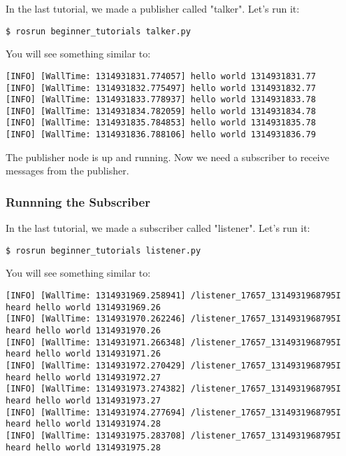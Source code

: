 In the last tutorial, we made a publisher called "talker". Let's run it:

\begin{lstlisting}[breaklines=true languages=bash]
$ rosrun beginner_tutorials talker.py
\end{lstlisting}

You will see something similar to:

\begin{lstlisting}[breaklines=true languages=bash]
[INFO] [WallTime: 1314931831.774057] hello world 1314931831.77
[INFO] [WallTime: 1314931832.775497] hello world 1314931832.77
[INFO] [WallTime: 1314931833.778937] hello world 1314931833.78
[INFO] [WallTime: 1314931834.782059] hello world 1314931834.78
[INFO] [WallTime: 1314931835.784853] hello world 1314931835.78
[INFO] [WallTime: 1314931836.788106] hello world 1314931836.79
\end{lstlisting}

The publisher node is up and running. Now we need a subscriber to receive messages from the publisher.

\subsubsection{Runnning the Subscriber}

In the last tutorial, we made a subscriber called "listener". Let's run it:

\begin{lstlisting}[breaklines=true language=bash]
$ rosrun beginner_tutorials listener.py
\end{lstlisting}

You will see something similar to:

\begin{lstlisting}[breaklines=true language=bash]
[INFO] [WallTime: 1314931969.258941] /listener_17657_1314931968795I heard hello world 1314931969.26
[INFO] [WallTime: 1314931970.262246] /listener_17657_1314931968795I heard hello world 1314931970.26
[INFO] [WallTime: 1314931971.266348] /listener_17657_1314931968795I heard hello world 1314931971.26
[INFO] [WallTime: 1314931972.270429] /listener_17657_1314931968795I heard hello world 1314931972.27
[INFO] [WallTime: 1314931973.274382] /listener_17657_1314931968795I heard hello world 1314931973.27
[INFO] [WallTime: 1314931974.277694] /listener_17657_1314931968795I heard hello world 1314931974.28
[INFO] [WallTime: 1314931975.283708] /listener_17657_1314931968795I heard hello world 1314931975.28
\end{lstlisting}

